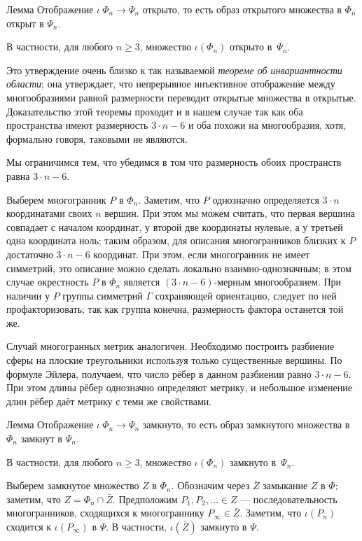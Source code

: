 \documentclass[oneside,a4paper]{article}
\begin{document}
\begin{thm}{Лемма}
Отображение $\iota\:\Phi_n\to\Psi_n$ открыто, 
то есть образ открытого множества в $\Phi_n$ открыт в $\Psi_n$.

В частности, для любого $n\ge 3$, множество $\iota(\Phi_n)$ открыто в~$\Psi_n$.
\end{thm}

Это утверждение очень близко к так называемой \emph{теореме об инвариантности области};
она утверждает, что непрерывное инъективное отображение между многообразиями равной размерности переводит открытые множества в открытые.
Доказательство этой теоремы проходит и в нашем случае так как оба пространства имеют размерность $3\cdot n-6$ и оба похожи на многообразия, хотя, формально говоря, таковыми не являются.

Мы ограничимся тем, что убедимся в том что размерность обоих пространств равна $3\cdot n-6$.

Выберем многогранник $P$ в $\Phi_n$.
Заметим, что $P$ однозначно определяется $3\cdot n$ координатами своих $n$ вершин.
При этом мы можем считать, что первая вершина совпадает с началом координат, у второй две координаты нулевые, а у третьей одна координата ноль; таким образом, для описания многогранников близких к $P$ достаточно $3\cdot n-6$ координат.
При этом, если многогранник не имеет симметрий, это описание можно сделать локально взаимно-однозначным;
в этом случае окрестность $P$ в $\Phi_n$ является $(3\cdot n-6)$-мерным многообразием.
При наличии у $P$ группы симметрий $\Gamma$ сохраняющей ориентацию, следует по ней профакторизовать;
так как группа конечна, размерность фактора останется той же.

Случай многогранных метрик аналогичен.
Необходимо построить разбиение сферы на плоские треугольники используя только существенные вершины.
По формуле Эйлера, получаем, что число рёбер в данном разбиении равно $3\cdot n-6$.
При этом длины рёбер однозначно определяют метрику, и небольшое изменение длин рёбер даёт метрику с теми же свойствами.


\begin{thm}{Лемма}
Отображение $\iota\:\Phi_n\to\Psi_n$ замкнуто, 
то есть образ замкнутого множества в $\Phi_n$ замкнут в $\Psi_n$.

В частности, для любого $n\ge 3$, множество $\iota(\Phi_n)$ замкнуто в~$\Psi_n$.
\end{thm}

Выберем замкнутое множество $Z$ в $\Phi_n$.
Обозначим через $\bar Z$ замыкание $Z$ в $\Phi$; заметим, что $Z=\Phi_n\cap \bar Z$.
Предположим $P_1,P_2,\dots\in Z$ --- последовательность многогранников, сходящихся к многограннику $P_\infty\in\bar Z$.
Заметим, что $\iota(P_n)$ сходится к $\iota(P_\infty)$  в $\Psi$.
В частности, $\iota(\bar Z)$ замкнуто в $\Psi$.
\end{document}
